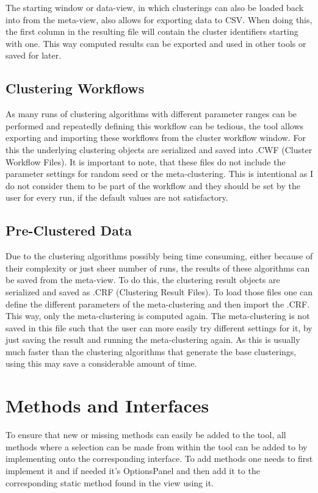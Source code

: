 \documentclass[
	a4paper,
	english,
	twoside,
	openright,               
	11pt                            
	]{report}
\begin{document}
The starting window or data-view, in which clusterings can also be loaded back into from the meta-view, also allows for exporting data to CSV. When doing this, the first column in the resulting file will contain the cluster identifiers starting with one. This way computed results can be exported and used in other tools or saved for later.

\subsection{Clustering Workflows}
As many runs of clustering algorithms with different parameter ranges can be performed and repeatedly defining this workflow can be tedious, the tool allows exporting and importing these workflows from the cluster workflow window. For this the underlying clustering objects are serialized and saved into .CWF (Cluster Workflow Files). It is important to note, that these files do not include the parameter settings for random seed or the meta-clustering. This is intentional as I do not consider them to be part of the workflow and they should be set by the user for every run, if the default values are not satisfactory.

\subsection{Pre-Clustered Data}
Due to the clustering algorithms possibly being time consuming, either because of their complexity or just sheer number of runs, the results of these algorithms can be saved from the meta-view. To do this, the clustering result objects are serialized and saved as .CRF (Clustering Result Files). To load those files one can define the different parameters of the meta-clustering and then import the .CRF. This way, only the meta-clustering is computed again. The meta-clustering is not saved in this file such that the user can more easily try different settings for it, by just saving the result and running the meta-clustering again. As this is usually much faster than the clustering algorithms that generate the base clusterings, using this may save a considerable amount of time.

\section{Methods and Interfaces}
To ensure that new or missing methods can easily be added to the tool, all methods where a selection can be made from within the tool can be added to by implementing onto the corresponding interface. To add methods one needs to first implement it and if needed it's OptionsPanel and then add it to the corresponding static method found in the view using it.
\end{document}

